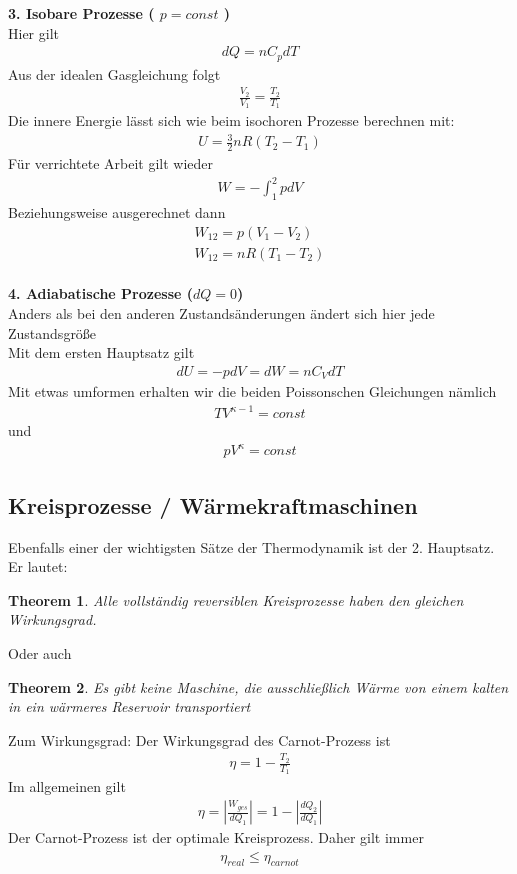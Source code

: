 \documentclass[a4paper,12pt]{report}
\newtheorem{theorem}{Theorem}
\begin{document}
\textbf{3. Isobare Prozesse ( $ p = const$ )} \\
Hier gilt 
\begin{align}
dQ = nC_pdT
\end{align}
Aus der idealen Gasgleichung folgt 
\begin{align}
\frac{V_2}{V_1} = \frac{T_2}{T_1}
\end{align}
Die innere Energie lässt sich wie beim isochoren Prozesse berechnen mit: 
\begin{align}
U = \frac{3}{2}nR(T_2-T_1)
\end{align}
Für verrichtete Arbeit gilt wieder 
\begin{align}
W = - \int_{1}^{2} pdV
\end{align}
Beziehungsweise ausgerechnet dann 
\begin{align}
W_{12} = p(V_1-V_2) \\
W_{12} = nR(T_1-T_2)
\end{align}
\\

\textbf{4. Adiabatische Prozesse ($dQ = 0$)} \\
Anders als bei den anderen Zustandsänderungen ändert sich hier jede Zustandsgröße \\
Mit dem ersten Hauptsatz gilt 
\begin{align}
dU = -pdV = dW = nC_VdT
\end{align}
Mit etwas umformen erhalten wir die beiden Poissonschen Gleichungen nämlich 
\begin{align}
TV^{\kappa -1} = const
\end{align}
und 
\begin{align}
pV^{\kappa} = const
\end{align}


\subsection{Kreisprozesse / Wärmekraftmaschinen}
Ebenfalls einer der wichtigsten Sätze der Thermodynamik ist der 2. Hauptsatz. Er lautet: 
\begin{theorem}
Alle vollständig reversiblen Kreisprozesse haben den gleichen Wirkungsgrad.
\end{theorem}
Oder auch 
\begin{theorem}
Es gibt keine Maschine, die ausschließlich Wärme von einem kalten in ein wärmeres Reservoir transportiert
\end{theorem}
Zum Wirkungsgrad: Der Wirkungsgrad des Carnot-Prozess ist 
\begin{align}
\eta = 1- \frac{T_2}{T_1} 
\end{align}
Im allgemeinen gilt 
\begin{align}
\eta = \left| \frac{W_{ges}}{dQ_1} \right| = 1 - \left| \frac{dQ_2}{dQ_1} \right|
\end{align}
Der Carnot-Prozess ist der optimale Kreisprozess. Daher gilt immer 
\begin{align}
\eta_{real} \leq \eta_{carnot}
\end{align}
\end{document}
